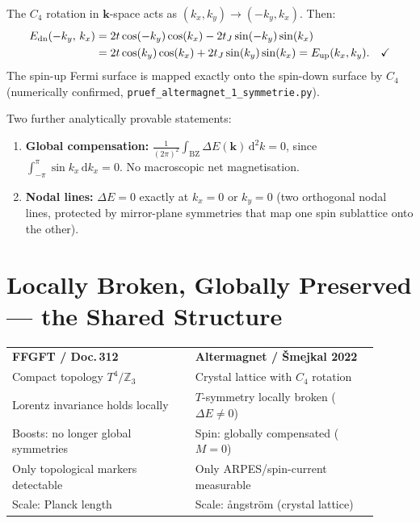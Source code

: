 \begin{tcolorbox}[proofbox,title={Proof: $C_4$ maps the spin-up onto the spin-down Fermi surface \B}]
The $C_4$ rotation in $\mathbf{k}$-space acts as
$(k_x, k_y) \to (-k_y, k_x)$. Then:
\begin{align}
  E_{\rm dn}(-k_y,\, k_x)
  &= 2t\cos(-k_y)\cos(k_x) - 2t_J\sin(-k_y)\sin(k_x) \notag\\
  &= 2t\cos(k_y)\cos(k_x) + 2t_J\sin(k_y)\sin(k_x)
   = E_{\rm up}(k_x, k_y). \quad\checkmark
\end{align}
The spin-up Fermi surface is mapped exactly onto the spin-down surface
by $C_4$ (numerically confirmed, \texttt{pruef\_altermagnet\_1\_symmetrie.py}).
\end{tcolorbox}

Two further analytically provable statements:

\begin{enumerate}
\item \textbf{Global compensation:}
  $\displaystyle\frac{1}{(2\pi)^2}
  \int_{\mathrm{BZ}} \Delta E(\mathbf{k})\,\mathrm{d}^2k = 0$,
  since $\int_{-\pi}^{\pi}\sin k_x\,\mathrm{d}k_x = 0$.
  No macroscopic net magnetisation. \B

\item \textbf{Nodal lines:}
  $\Delta E = 0$ exactly at $k_x = 0$ or $k_y = 0$ (two orthogonal
  nodal lines, protected by mirror-plane symmetries that map one spin
  sublattice onto the other). \B
\end{enumerate}

\section{Locally Broken, Globally Preserved — the Shared Structure}

\begin{tcolorbox}[ffgftbox,title={Structural comparison with Doc.\,312 §\,Lorentz}]
\begin{tabular}{p{0.45\linewidth}p{0.45\linewidth}}
\textbf{FFGFT / Doc.\,312} & \textbf{Altermagnet / Šmejkal 2022}\\[4pt]
Compact topology $T^4/\mathbb{Z}_3$ & Crystal lattice with $C_4$ rotation\\[2pt]
Lorentz invariance holds locally & $T$-symmetry locally broken ($\Delta E \neq 0$)\\[2pt]
Boosts: no longer global symmetries & Spin: globally compensated ($M=0$)\\[2pt]
Only topological markers detectable & Only ARPES/spin-current measurable\\[2pt]
Scale: Planck length & Scale: ångström (crystal lattice)
\end{tabular}
\end{tcolorbox}

